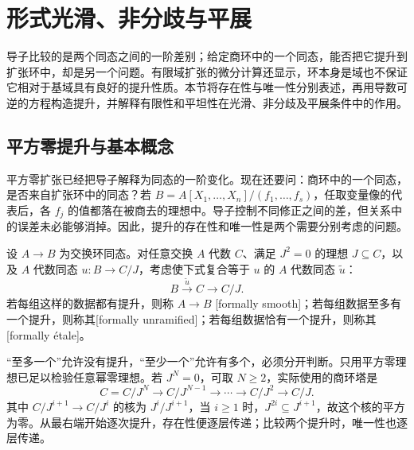 
\section{形式光滑、非分歧与平展}
\label{b3:sec:1405}

导子比较的是两个同态之间的一阶差别；给定商环中的一个同态，能否把它提升到扩张环中，却是另一个问题。有限域扩张的微分计算还显示，环本身是域也不保证它相对于基域具有良好的提升性质。本节将存在性与唯一性分别表述，再用导数可逆的方程构造提升，并解释有限性和平坦性在光滑、非分歧及平展条件中的作用。

\subsection{平方零提升与基本概念}
\label{b3:subsec:1405:01}
\label{b3:subsec:1404:02}

平方零扩张已经把导子解释为同态的一阶变化。现在还要问：商环中的一个同态，是否来自扩张环中的同态？若 \(B=A[X_1,\ldots,X_n]/(f_1,\ldots,f_s)\)，任取变量像的代表后，各 \(f_j\) 的值都落在被商去的理想中。导子控制不同修正之间的差，但关系中的误差未必能够消掉。因此，提升的存在性和唯一性是两个需要分别考虑的问题。

\begin{definition}\label{b3:def:formal-infinitesimal-properties}
	设 \(A\to B\) 为交换环同态。对任意交换 \(A\) 代数 \(C\)、满足 \(J^2=0\) 的理想 \(J\subseteq C\)，以及 \(A\) 代数同态 \(u:B\to C/J\)，考虑使下式复合等于 \(u\) 的 \(A\) 代数同态 \(\widetilde u\)：
	\[
		B\xrightarrow{\widetilde u}C\longrightarrow C/J.
	\]
	若每组这样的数据都有提升，则称 \(A\to B\) [formally smooth]；若每组数据至多有一个提升，则称其[formally unramified]；若每组数据恰有一个提升，则称其[formally étale]。
\end{definition}

“至多一个”允许没有提升，“至少一个”允许有多个，必须分开判断。只用平方零理想已足以检验任意幂零理想。若 \(J^N=0\)，可取 \(N\ge2\)，实际使用的商环塔是
\[
	C=C/J^N\longrightarrow C/J^{N-1}\longrightarrow\cdots \longrightarrow C/J^2\longrightarrow C/J.
\]
其中 \(C/J^{i+1}\to C/J^i\) 的核为 \(J^i/J^{i+1}\)，当 \(i\ge1\) 时，\(J^{2i}\subseteq J^{i+1}\)，故这个核的平方为零。从最右端开始逐次提升，存在性便逐层传递；比较两个提升时，唯一性也逐层传递。

